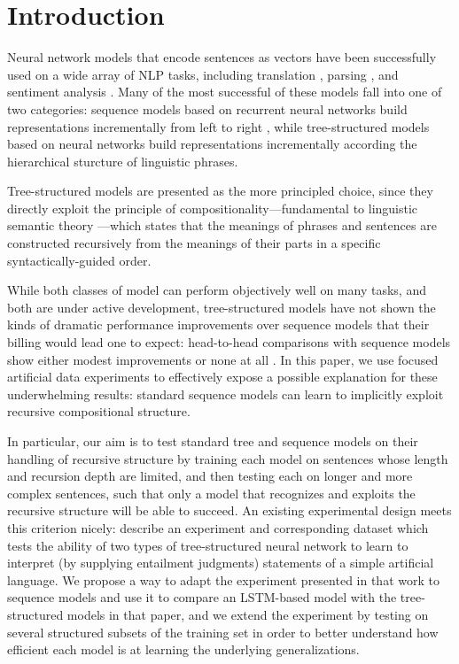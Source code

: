 \section{Introduction}\label{sec:intro}

Neural network models that encode sentences as vectors have been successfully used on a wide array of NLP tasks, including translation \cite{sutskever2014sequence}, parsing \cite{dyer2015transition}, and sentiment analysis \cite{tai2015improved}. Many of the most successful of these models fall into one of two categories: sequence models based on recurrent neural networks build representations incrementally from left to right \cite{sutskever2014sequence} , while tree-structured models based on  neural networks \cite{socher2011semi,irsoydeep,tai2015improved} build representations incrementally according the hierarchical sturcture of linguistic phrases. 

Tree-structured models are presented as the more principled choice, since they directly exploit the principle of compositionality---fundamental to linguistic semantic theory \cite{Partee84,Janssen97}---which states that the meanings of phrases and sentences are constructed recursively from the meanings of their parts in a specific syntactically-guided order.

While both classes of model can perform objectively well on many tasks, and both are under active development, tree-structured models have not shown the kinds of dramatic performance improvements over sequence models that their billing would lead one to expect: head-to-head comparisons with sequence models show either modest improvements \cite{tai2015improved} or none at all \cite{li2015tree}. 
In this paper, we use focused artificial data experiments to effectively expose a possible explanation for these underwhelming results: standard sequence models can learn to implicitly exploit recursive compositional structure.

In particular, our aim is to test standard tree and sequence models on their handling of recursive structure by training each model on sentences whose length and recursion depth are limited, and then testing each on longer and more complex sentences, such that only a model that recognizes and exploits the recursive structure will be able to succeed. An existing experimental design meets this criterion nicely:  describe an experiment and corresponding dataset which tests the ability of two types of tree-structured neural network to learn to interpret (by supplying entailment judgments) statements of a simple artificial language. We propose a way to adapt the experiment presented in that work to sequence models and use it to compare an LSTM-based model with the tree-structured models in that paper, and we extend the experiment by testing on several structured subsets of the training set in order to better understand how efficient each model is at learning the underlying generalizations.

